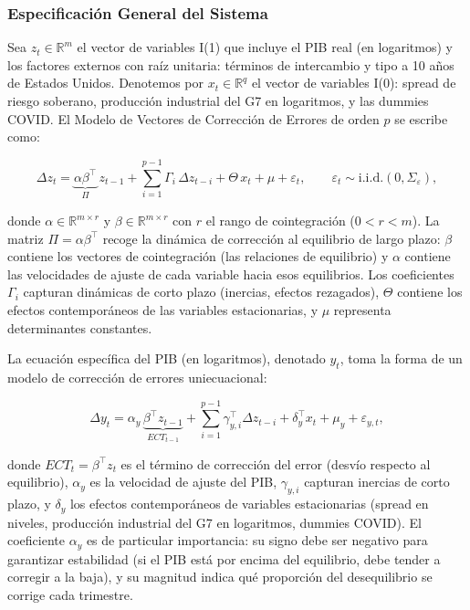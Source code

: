\documentclass[3p,11pt,draft,natbib=false]{elsarticle}
\begin{document}
\subsubsection{Especificación General del Sistema}

Sea $z_t \in \mathbb{R}^{m}$ el vector de variables I(1) que incluye el PIB real (en logaritmos) y los factores externos con raíz unitaria: términos de intercambio y tipo a 10 años de Estados Unidos. Denotemos por $x_t \in \mathbb{R}^{q}$ el vector de variables I(0): spread de riesgo soberano, producción industrial del G7 en logaritmos, y las dummies COVID. El Modelo de Vectores de Corrección de Errores de orden $p$ se escribe como:

\begin{equation}
\Delta z_t = \underbrace{\alpha \beta^\top}_{\Pi}\, z_{t-1} + \sum_{i=1}^{p-1} \Gamma_i\, \Delta z_{t-i} + \Theta\, x_t + \mu + \varepsilon_t, \qquad \varepsilon_t \sim \text{i.i.d.} (0,\Sigma_\varepsilon),
\label{eq:vecm_system}
\end{equation}

donde $\alpha \in \mathbb{R}^{m \times r}$ y $\beta \in \mathbb{R}^{m \times r}$ con $r$ el rango de cointegración ($0<r<m$). La matriz $\Pi=\alpha\beta^\top$ recoge la dinámica de corrección al equilibrio de largo plazo: $\beta$ contiene los vectores de cointegración (las relaciones de equilibrio) y $\alpha$ contiene las velocidades de ajuste de cada variable hacia esos equilibrios. Los coeficientes $\Gamma_i$ capturan dinámicas de corto plazo (inercias, efectos rezagados), $\Theta$ contiene los efectos contemporáneos de las variables estacionarias, y $\mu$ representa determinantes constantes.

La ecuación específica del PIB (en logaritmos), denotado $y_t$, toma la forma de un modelo de corrección de errores uniecuacional:

\begin{equation}
\Delta y_t = \alpha_y\, \underbrace{\beta^\top z_{t-1}}_{\displaystyle ECT_{t-1}} + \sum_{i=1}^{p-1} \gamma_{y,i}^\top \Delta z_{t-i} + \delta_y^\top x_t + \mu_y + \varepsilon_{y,t},
\label{eq:ecm_y}
\end{equation}

donde $ECT_{t}=\beta^\top z_t$ es el término de corrección del error (desvío respecto al equilibrio), $\alpha_y$ es la velocidad de ajuste del PIB, $\gamma_{y,i}$ capturan inercias de corto plazo, y $\delta_y$ los efectos contemporáneos de variables estacionarias (spread en niveles, producción industrial del G7 en logaritmos, dummies COVID). El coeficiente $\alpha_y$ es de particular importancia: su signo debe ser negativo para garantizar estabilidad (si el PIB está por encima del equilibrio, debe tender a corregir a la baja), y su magnitud indica qué proporción del desequilibrio se corrige cada trimestre.
\end{document}
